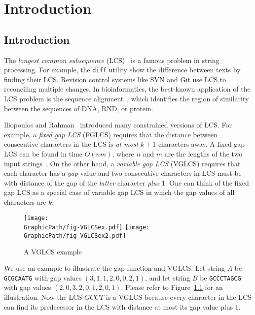 \ifdefined\MasterThesis
\chapter{Introduction}
\else
\section{Introduction}
\fi
\label{sec:Introduction}

The {\em longest common subsequence} (LCS)~\cite{Hirschberg1975ALS} is
a famous problem in string processing.  For example, the {\tt diff}
utility show the difference between texts by finding their LCS.
Revision control systems like SVN and Git use LCS to reconciling
multiple changes.  In bioinformatics, the best-known application of
the LCS problem is the sequence
alignment~\cite{mount2001bioinformatics, Ann2010EfficientAF}, which
identifies the region of similarity between the sequences of DNA, RND,
or protein.

Iliopoulos and Rahman~\cite{Rahman2006AlgorithmsFC} introduced many
constrained versions of LCS.  For example, a {\em fixed gap LCS} (FGLCS)
requires that the distance between consecutive characters in the LCS is
{\em at most} $k + 1$ characters away.  A fixed gap LCS can be found in
time $O(nm)$, where $n$ and $m$ are the lengths of the two input
strings~\cite{Rahman2006AlgorithmsFC}.  On the other hand, a {\em
variable gap LCS} (VGLCS) requires that each character has a {\em gap}
value and two consecutive characters in LCS must be with distance of the
gap of the {\em latter} character {\em plus} 1.  One can think of the
fixed gap LCS as a special case of variable gap LCS in which the gap
values of all characters are $k$.

\begin{figure}[!thb]
  \centering
  \texttt{[image: \\GraphicPath/fig-VGLCSex.pdf]}
  \texttt{[image: \\GraphicPath/fig-VGLCSex2.pdf]}
  \caption{A VGLCS example} \label{fig:VGLCSex}
\end{figure}

We use an example to illustrate the gap function and VGLCS.  Let string
$A$ be {\tt GCGCAATG} with gap values $(3, 1, 1, 2, 0, 0, 2, 1)$, and
let string $B$ be {\tt GCCCTAGCG} with gap values $(2, 0, 3, 2, 0, 1,
2, 0, 1)$.  Please refer to Figure~\ref{fig:VGLCSex} for an
illustration.  Now the LCS $GCCT$ is a VGLCS because every character
in the LCS can find its predecessor in the LCS with distance at most
its gap value plus 1.

